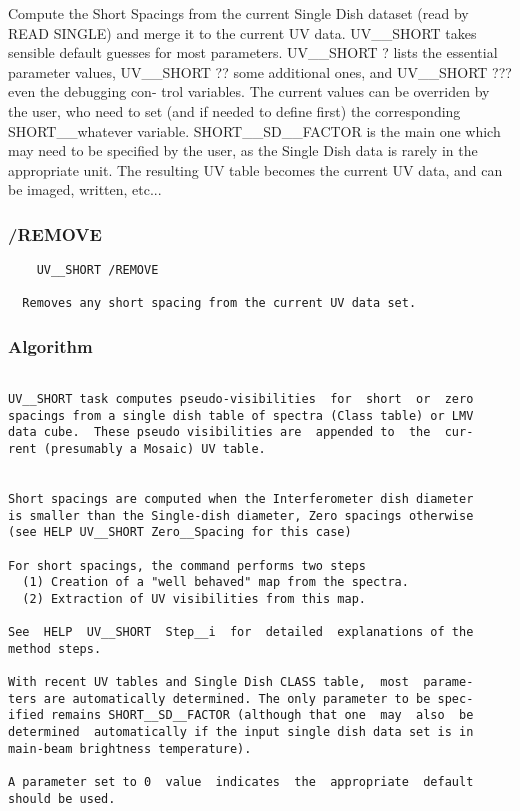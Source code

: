 Compute  the  Short Spacings from the current Single Dish dataset
(read by READ SINGLE) and merge it to the current UV data.
  UV__SHORT takes sensible default guesses for  most  parameters.
UV__SHORT  ?   lists the essential parameter values, UV__SHORT ??
some additional ones, and UV__SHORT ??? even the  debugging  con-
trol variables.
    The  current values can be overriden by the user, who need to
set  (and  if  needed  to   define   first)   the   corresponding
SHORT__whatever   variable.   SHORT__SD__FACTOR   is the main one
which may need to be specified by the user, as  the  Single  Dish
data is rarely in the appropriate unit.
  The resulting UV table becomes the current UV data, and can  be
imaged, written, etc...
\subsubsection{/REMOVE}
\begin{verbatim}
    UV__SHORT /REMOVE

  Removes any short spacing from the current UV data set.

\end{verbatim}
\subsubsection{Algorithm}
\begin{verbatim}

UV__SHORT task computes pseudo-visibilities  for  short  or  zero
spacings from a single dish table of spectra (Class table) or LMV
data cube.  These pseudo visibilities are  appended to  the  cur-
rent (presumably a Mosaic) UV table.


Short spacings are computed when the Interferometer dish diameter
is smaller than the Single-dish diameter, Zero spacings otherwise
(see HELP UV__SHORT Zero__Spacing for this case)

For short spacings, the command performs two steps
  (1) Creation of a "well behaved" map from the spectra.
  (2) Extraction of UV visibilities from this map.

See  HELP  UV__SHORT  Step__i  for  detailed  explanations of the
method steps.

With recent UV tables and Single Dish CLASS table,  most  parame-
ters are automatically determined. The only parameter to be spec-
ified remains SHORT__SD__FACTOR (although that one  may  also  be
determined  automatically if the input single dish data set is in
main-beam brightness temperature).

A parameter set to 0  value  indicates  the  appropriate  default
should be used.

\end{verbatim}
